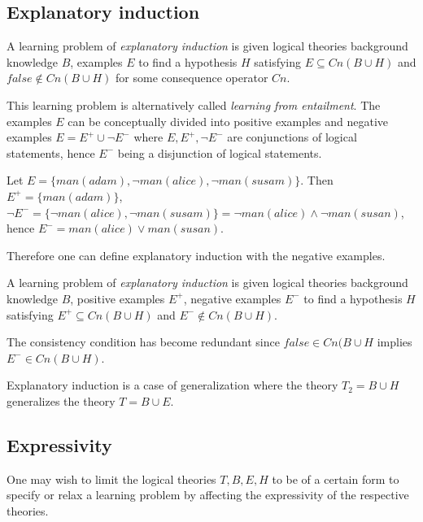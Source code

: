 \subsection{Explanatory induction\cite{yamamoto2012inverse}}
\begin{defn}\cite{flach1996rationality} A learning problem of \emph{explanatory induction} is given logical theories background knowledge $B$, examples $E$ to find a hypothesis $H$ satisfying $E \subseteq Cn(B \cup H)$ and $false \not\in Cn(B \cup H)$ for some consequence operator $Cn$.
\end{defn}

This learning problem is alternatively called \emph{learning from entailment}\cite{muggleton1995inverse}\cite{de1997logical}. The examples $E$ can be conceptually divided into positive examples and negative examples $E=E^{+} \cup \neg E^{-}$ where $E, E^{+}, \neg E^{-}$ are conjunctions of logical statements, hence $E^{-}$ being a disjunction of logical statements.

\begin{exmp}\cite{explanatory_induction_example}
Let $E=\{man(adam), \neg man(alice), \neg man(susam)\}$. Then $E^{+}=\{man(adam)\}$,
$\neg E^{-} = \{\neg man(alice), \neg man(susam)\}=\neg man(alice) \land \neg man(susan)$, hence
$E^{-} = man(alice) \lor man(susan)$.
\end{exmp}

Therefore one can define explanatory induction with the negative examples.
\begin{defn}A learning problem of \emph{explanatory induction} is given logical theories background knowledge $B$, positive examples $E^{+}$, negative examples $E^{-}$ to find a hypothesis $H$ satisfying
$E^{+} \subseteq Cn(B \cup H)$ and $E^{-} \not\in Cn(B \cup H)$.
\end{defn}
The consistency condition has become redundant since $false \in Cn(B \cup H$ implies $E^{-} \in Cn(B \cup H)$.

Explanatory induction is a case of generalization where the theory $T_2=B \cup H$ generalizes the theory $T = B \cup E$.

\subsection{Expressivity}
One may wish to limit the logical theories $T, B, E, H$ to be of a certain form to specify or relax a learning problem by affecting the expressivity of the respective theories.

